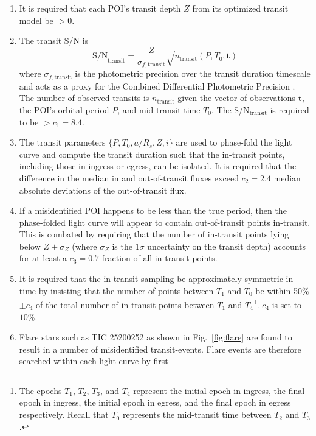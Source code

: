 \begin{enumerate}
\item It is required that each POI's transit depth $Z$ from its optimized transit model be $>0$.
\item The transit S/N is
  \begin{equation}
    \text{S/N}_{\text{transit}} = \frac{Z}{\sigma_{f,\text{transit}}} \sqrt{n_{\text{transit}}(P,T_0,\mathbf{t})}
  \end{equation}
  where $\sigma_{f,\text{transit}}$ is the photometric precision over the transit duration timescale
  and acts as a proxy for the Combined Differential Photometric Precision
  \citep[CDPP$_{\text{transit}}$;][]{christiansen12}. The number of observed transits is
  $n_{\text{transit}}$ given the vector of observations  $\mathbf{t}$, the POI's orbital
  period $P$, and mid-transit time $T_0$. The S/N$_{\text{transit}}$ is required to be $> c_1=8.4$.  
\item The transit parameters $\{ P,T_0,a/R_s,Z,i \}$ 
  are used to phase-fold the light curve and compute the transit duration \citep{winn10}
  such that the in-transit points, including those in ingress or egress, can be isolated.
  It is required that the difference in the median in and out-of-transit fluxes
  exceed $c_2=2.4$ median absolute deviations of the out-of-transit flux.
\item If a misidentified POI happens to be less than the true period, then the phase-folded light curve
  will appear to contain out-of-transit points in-transit. This is combated by requiring that the number of
  in-transit points lying below $Z+\sigma_Z$ (where $\sigma_Z$ is the $1\sigma$ uncertainty on the
  transit depth) accounts for at least a $c_3=0.7$ fraction of all in-transit points.
\item It is required that the in-transit sampling be approximately symmetric in time by insisting that the
  number of points between $T_1$ and $T_0$ be within 50\% $\pm c_4$ of the total
  number of in-transit points between $T_1$ and $T_4$\footnote{The epochs $T_1$, $T_2$, $T_3$, and
      $T_4$ represent the initial epoch in ingress, the final epoch in ingress, the initial epoch in egress,
      and the final epoch in egress respectively. Recall that $T_0$ represents the mid-transit time between
      $T_2$ and $T_3$.}. $c_4$ is set to $10$\%.
\item Flare stars such as TIC 25200252 as shown in Fig.~\ref{fig:flare} are found to result in a number
  of misidentified transit-events. Flare events are therefore searched within each light curve by first

\end{enumerate}
